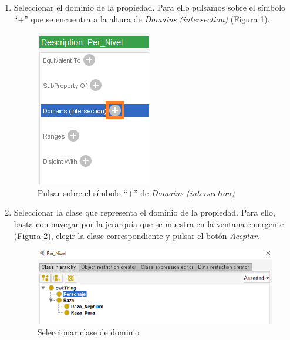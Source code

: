 \begin{enumerate}
    \item Seleccionar el dominio de la propiedad. Para ello pulsamos sobre el símbolo “+” que se encuentra a la altura de 
    \textit{Domains (intersection)} (Figura \ref*{CreateDataProp_3}).
    \begin{figure}[ht]
        \centering
        \includegraphics[scale=0.6]{Figures/Protege/CreateDataProp_3.png}
        \caption{Pulsar sobre el símbolo “+” de \textit{Domains (intersection)}}
        \label{CreateDataProp_3}
    \end{figure}
    \newpage

    \item Seleccionar la clase que representa el dominio de la propiedad. Para ello, basta con navegar por la 
    jerarquía que se muestra en la ventana emergente (Figura \ref*{CreateDataProp_4}), elegir la clase correspondiente 
    y pulsar el botón \textit{Aceptar}.

    \begin{figure}[ht]
        \centering
        \includegraphics[scale=0.6]{Figures/Protege/CreateDataProp_4.png}
        \caption{Seleccionar clase de dominio}
        \label{CreateDataProp_4}
    \end{figure}


\end{enumerate}
